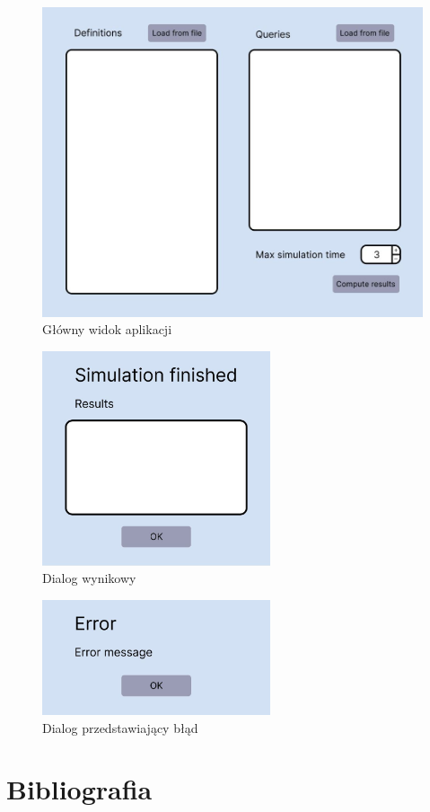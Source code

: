 \documentclass{article}
\begin{document}
\begin{figure}[H]
    \centering
    \includegraphics[width=\textwidth]{images/main_view.JPG}
    \caption{ Główny widok aplikacji }
    \label{fig:main_view}
\end{figure}

\begin{figure}[H]
    \centering
    \includegraphics[width=0.6\textwidth]{images/success.JPG}
    \caption{ Dialog wynikowy }
    \label{fig:success}
\end{figure}

\begin{figure}[H]
    \centering
    \includegraphics[width=0.6\textwidth]{images/error.JPG}
    \caption{ Dialog przedstawiający błąd }
    \label{fig:error}
\end{figure}


\section{Bibliografia}
\end{document}
